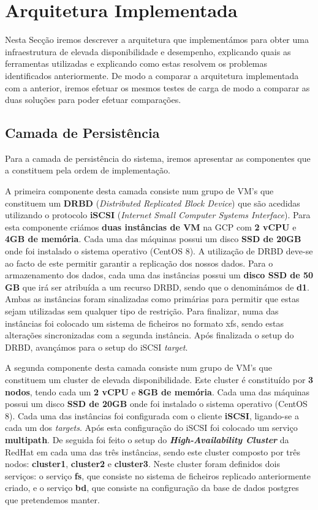 \section{Arquitetura Implementada}

Nesta Secção iremos descrever a arquitetura que implementámos para obter uma infraestrutura de elevada disponibilidade e desempenho, explicando quais as ferramentas utilizadas e explicando como estas resolvem os problemas identificados anteriormente. De modo a comparar a arquitetura implementada com a anterior, iremos efetuar os mesmos testes de carga de modo a comparar as duas soluções para poder efetuar comparações.

\subsection{Camada de Persistência}

Para a camada de persistência do sistema, iremos apresentar as componentes que a constituem pela ordem de implementação. 

A primeira componente desta camada consiste num grupo de VM's que constituem um \textbf{DRBD} (\textit{Distributed Replicated Block Device}) que são acedidas utilizando o protocolo \textbf{iSCSI} (\textit{Internet Small Computer Systems Interface}). Para esta componente criámos \textbf{duas instâncias de VM} na GCP com \textbf{2 vCPU} e \textbf{4GB de memória}. Cada uma das máquinas possui um disco \textbf{SSD de 20GB} onde foi instalado o sistema operativo (CentOS 8). A utilização de DRBD deve-se ao facto de este permitir garantir a replicação dos nossos dados. Para o armazenamento dos dados, cada uma das instâncias possui um \textbf{disco SSD de 50 GB} que irá ser atribuída a um recurso DRBD, sendo que o denominámos de \textbf{d1}. Ambas as instâncias foram sinalizadas como primárias para permitir que estas sejam utilizadas sem qualquer tipo de restrição. Para finalizar, numa das instâncias foi colocado um sistema de ficheiros no formato xfs, sendo estas alterações sincronizadas com a segunda instância. Após finalizada o setup do DRBD, avançámos para o setup do iSCSI \textit{target}.

A segunda componente desta camada consiste num grupo de VM's que constituem um cluster de elevada disponibilidade. Este cluster é constituído por \textbf{3 nodos}, tendo cada um \textbf{2 vCPU} e \textbf{8GB de memória}. Cada uma das máquinas possui um disco \textbf{SSD de 20GB} onde foi instalado o sistema operativo (CentOS 8). Cada uma das instâncias foi configurada com o cliente \textbf{iSCSI}, ligando-se a cada um dos \textit{targets}. Após esta configuração do iSCSI foi colocado um serviço \textbf{multipath}. De seguida foi feito o setup do \textbf{\textit{High-Availability Cluster}} da RedHat em cada uma das três instâncias, sendo este cluster composto por três nodos: \textbf{cluster1}, \textbf{cluster2} e \textbf{cluster3}. Neste cluster foram definidos dois serviços: o serviço \textbf{fs}, que consiste no sistema de ficheiros replicado anteriormente criado, e o serviço \textbf{bd}, que consiste na configuração da base de dados postgres que pretendemos manter.

